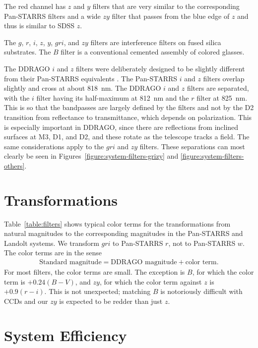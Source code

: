 The red channel has $z$ and $y$ filters that are very similar to the corresponding Pan-STARRS filters and a wide $zy$ filter that passes from the blue edge of $z$ and thus is similar to SDSS $z$.

The $g$, $r$, $i$, $z$, $y$, $gri$, and $zy$ filters are interference filters on fused silica substrates. The $B$ filter is a conventional cemented assembly of colored glasses.

The DDRAGO $i$ and $z$ filters were deliberately designed to be slightly different from their Pan-STARRS equivalents \citep{Tonry-2012}. The Pan-STARRS $i$ and $z$ filters overlap slightly and cross at about 818~nm. The DDRAGO $i$ and $z$ filters are separated, with the $i$ filter having its half-maximum at 812~nm and the $r$ filter at 825~nm. This is so that the bandpasses are largely defined by the filters and not by the D2 transition from reflectance to transmittance, which depends on polarization. This is especially important in DDRAGO, since there are reflections from inclined surfaces at M3, D1, and D2, and these rotate as the telescope tracks a field. The same considerations apply to the $gri$ and $zy$ filters. These separations can most clearly be seen in Figures~\ref{figure:system-filters-grizy} and \ref{figure:system-filters-others}.


\section{Transformations}

Table~\ref{table:filters} shows typical color terms for the transformations from natural magnitudes to the corresponding magnitudes in the Pan-STARRS and Landolt systems. We transform $gri$ to Pan-STARRS $r$, not to Pan-STARRS $w$. The color terms are in the sense
\begin{align}
\mbox{Standard magnitude} = \mbox{DDRAGO magnitude} + \mbox{color term}.
\end{align}
For most filters, the color terms are small. The exception is $B$, for which the color term is $+0.24(B-V)$, and $zy$, for which the color term against $z$ is $+0.9(r-i)$. This is not unexpected; matching $B$ is notoriously difficult with CCDs and our $zy$ is expected to be redder than just $z$.

\section{System Efficiency}

